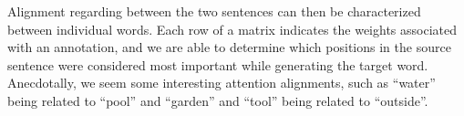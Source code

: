 \documentclass[11pt]{article}
\begin{document}
Alignment regarding between the two sentences can then be characterized between individual words. Each row of a matrix indicates the weights associated with an annotation, and we are able to determine which positions in the source sentence were considered most important while generating the target word. Anecdotally, we seem some interesting attention alignments, such as ``water'' being related to ``pool'' and ``garden'' and ``tool'' being related to ``outside''.






\end{document}
